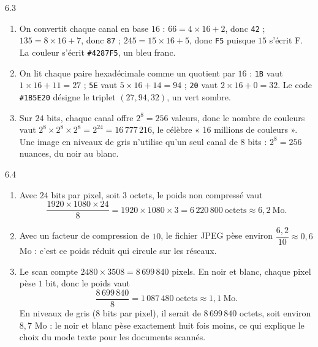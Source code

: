 \begin{corrige}{6.3}
\begin{enumerate}
\item On convertit chaque canal en base $16$ : $66 = 4 \times 16 + 2$, donc \texttt{42} ; $135 = 8 \times 16 + 7$, donc \texttt{87} ; $245 = 15 \times 16 + 5$, donc \texttt{F5} puisque $15$ s'écrit F. La couleur s'écrit \texttt{\#4287F5}, un bleu franc.
\item On lit chaque paire hexadécimale comme un quotient par $16$ : \texttt{1B} vaut $1 \times 16 + 11 = 27$ ; \texttt{5E} vaut $5 \times 16 + 14 = 94$ ; \texttt{20} vaut $2 \times 16 + 0 = 32$. Le code \texttt{\#1B5E20} désigne le triplet $(27, 94, 32)$, un vert sombre.
\item Sur $24$ bits, chaque canal offre $2^8 = 256$ valeurs, donc le nombre de couleurs vaut $2^{8} \times 2^{8} \times 2^{8} = 2^{24} = 16\,777\,216$, le célèbre « 16 millions de couleurs ». Une image en niveaux de gris n'utilise qu'un seul canal de $8$ bits : $2^{8} = 256$ nuances, du noir au blanc.
\end{enumerate}
\end{corrige}

\begin{corrige}{6.4}
\begin{enumerate}
\item Avec $24$ bits par pixel, soit $3$ octets, le poids non compressé vaut
\[
\frac{1920 \times 1080 \times 24}{8} = 1920 \times 1080 \times 3 = 6\,220\,800 \ \text{octets} \approx 6{,}2 \ \text{Mo} .
\]
\item Avec un facteur de compression de $10$, le fichier JPEG pèse environ $\dfrac{6{,}2}{10} \approx 0{,}6$ Mo : c'est ce poids réduit qui circule sur les réseaux.
\item Le scan compte $2480 \times 3508 = 8\,699\,840$ pixels. En noir et blanc, chaque pixel pèse $1$ bit, donc le poids vaut
\[
\frac{8\,699\,840}{8} = 1\,087\,480 \ \text{octets} \approx 1{,}1 \ \text{Mo} .
\]
En niveaux de gris ($8$ bits par pixel), il serait de $8\,699\,840$ octets, soit environ $8{,}7$ Mo : le noir et blanc pèse exactement huit fois moins, ce qui explique le choix du mode texte pour les documents scannés.
\end{enumerate}
\end{corrige}
